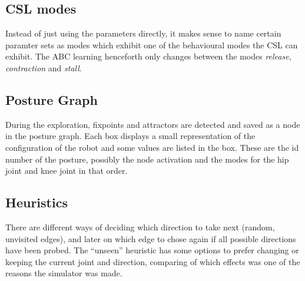 \documentclass[10pt,a4paper]{article}
\begin{document}
    \subsection{CSL modes}
        Instead of just using the parameters directly, it makes sense to name certain paramter sets
        as modes which exhibit one of the behavioural modes the CSL can exhibit.
        The ABC learning henceforth only changes between the modes \textit{release}, \textit{contraction}
        and \textit{stall}.

    \subsection{Posture Graph}
        During the exploration, fixpoints and attractors are detected and saved as a node in the
        posture graph. Each box displays a small representation of the configuration of the robot
        and some values are listed in the box. These are the id number of the posture, possibly the
        node activation and the modes for the hip joint and knee joint in that order.

    \subsection{Heuristics}
        There are different ways of deciding which direction to take next (random, unvisited edges),
        and later on which edge to chose again if all possible directions have been probed. The
        ``unseen'' heuristic has some options to prefer changing or keeping the current joint and
        direction, comparing of which effects was one of the reasons the simulator was made.
\end{document}
